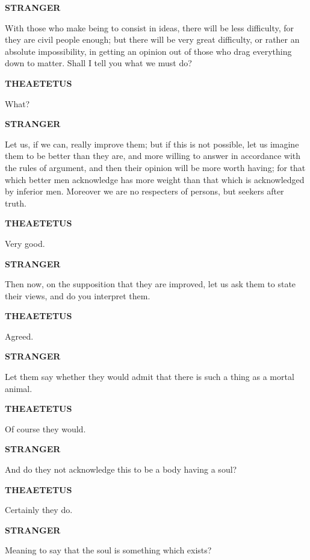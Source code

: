 \documentclass[11pt,letter]{article}
\begin{document}
\par \textbf{STRANGER}
\par   With those who make being to consist in ideas, there will be less difficulty, for they are civil people enough; but there will be very great difficulty, or rather an absolute impossibility, in getting an opinion out of those who drag everything down to matter. Shall I tell you what we must do?

\par \textbf{THEAETETUS}
\par   What?

\par \textbf{STRANGER}
\par   Let us, if we can, really improve them; but if this is not possible, let us imagine them to be better than they are, and more willing to answer in accordance with the rules of argument, and then their opinion will be more worth having; for that which better men acknowledge has more weight than that which is acknowledged by inferior men. Moreover we are no respecters of persons, but seekers after truth.

\par \textbf{THEAETETUS}
\par   Very good.

\par \textbf{STRANGER}
\par   Then now, on the supposition that they are improved, let us ask them to state their views, and do you interpret them.

\par \textbf{THEAETETUS}
\par   Agreed.

\par \textbf{STRANGER}
\par   Let them say whether they would admit that there is such a thing as a mortal animal.

\par \textbf{THEAETETUS}
\par   Of course they would.

\par \textbf{STRANGER}
\par   And do they not acknowledge this to be a body having a soul?

\par \textbf{THEAETETUS}
\par   Certainly they do.

\par \textbf{STRANGER}
\par   Meaning to say that the soul is something which exists?
\end{document}
